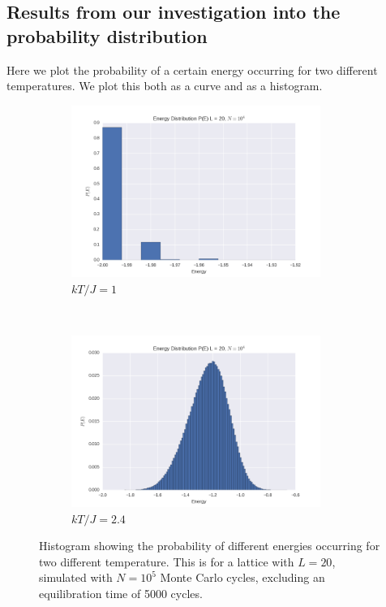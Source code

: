 \documentclass[a4paper, 10pt]{article}
\begin{document}
\subsection{Results from our investigation into the probability distribution}
Here we plot the probability of a certain energy occurring for two different temperatures. We plot this both as a curve and as a histogram.
\begin{figure}[!ht]
    \centering
    \begin{subfigure}[H!]{0.5\textwidth}
        \centering
        \includegraphics[height=2.2in]{energyDistHistoT1.png}
        \caption{$kT/J=1$}
    \end{subfigure}%
    ~ 
    \begin{subfigure}[H!]{0.5\textwidth}
        \centering
        \includegraphics[height=2.2in]{energyDistHisto.png}
        \caption{$kT/J=2.4$}
    \end{subfigure}
       \caption{Histogram showing the probability of different energies occurring for two different temperature. This is for a lattice with $L=20$, simulated with $N=10^5$ Monte Carlo cycles, excluding an equilibration time of 5000 cycles. }\label{fig:histograms}
\end{figure}
\end{document}
